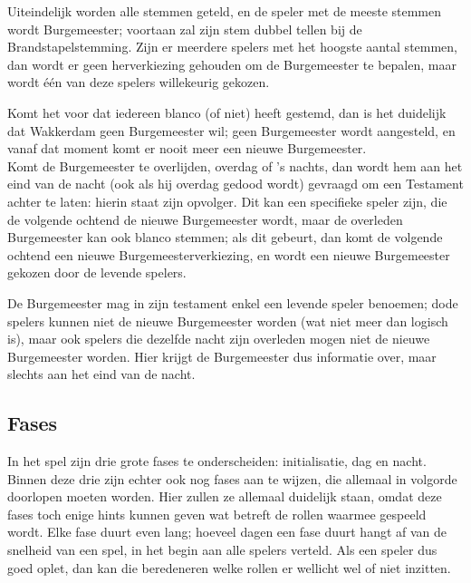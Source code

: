 \documentclass[12pt]{article}
\begin{document}
      Uiteindelijk worden alle stemmen geteld, en de speler met de meeste stemmen wordt Burgemeester; voortaan zal zijn stem dubbel tellen bij de Brandstapelstemming. Zijn er meerdere spelers met het hoogste aantal stemmen, dan wordt er geen herverkiezing gehouden om de Burgemeester te bepalen, maar wordt \'e\'en van deze spelers willekeurig gekozen.
      
      Komt het voor dat iedereen blanco (of niet) heeft gestemd, dan is het duidelijk dat Wakkerdam geen Burgemeester wil; geen Burgemeester wordt aangesteld, en vanaf dat moment komt er nooit meer een nieuwe Burgemeester. 
      \\[\baselineskip]
      Komt de Burgemeester te overlijden, overdag of 's nachts, dan wordt hem aan het eind van de nacht (ook als hij overdag gedood wordt) gevraagd om een Testament achter te laten: hierin staat zijn opvolger. Dit kan een specifieke speler zijn, die de volgende ochtend de nieuwe Burgemeester wordt, maar de overleden Burgemeester kan ook blanco stemmen; als dit gebeurt, dan komt de volgende ochtend een nieuwe Burgemeesterverkiezing, en wordt een nieuwe Burgemeester gekozen door de levende spelers.

      De Burgemeester mag in zijn testament enkel een levende speler benoemen; dode spelers kunnen niet de nieuwe Burgemeester worden (wat niet meer dan logisch is), maar ook spelers die dezelfde nacht zijn overleden mogen niet de nieuwe Burgemeester worden. Hier krijgt de Burgemeester dus informatie over, maar slechts aan het eind van de nacht.

  \subsection{Fases}
  
    In het spel zijn drie grote fases te onderscheiden: initialisatie, dag en nacht. Binnen deze drie zijn echter ook nog fases aan te wijzen, die allemaal in volgorde doorlopen moeten worden. Hier zullen ze allemaal duidelijk staan, omdat deze fases toch enige hints kunnen geven wat betreft de rollen waarmee gespeeld wordt. Elke fase duurt even lang; hoeveel dagen een fase duurt hangt af van de snelheid van een spel, in het begin aan alle spelers verteld. Als een speler dus goed oplet, dan kan die beredeneren welke rollen er wellicht wel of niet inzitten.
    
\end{document}
